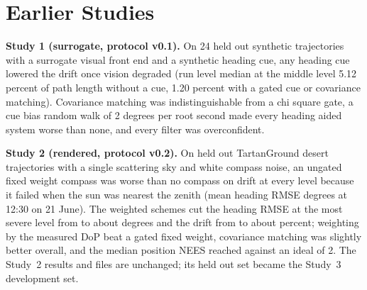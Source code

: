\section{Earlier Studies}
\label{sec:earlier}
\textbf{Study 1 (surrogate, protocol v0.1).} On 24 held out synthetic trajectories with a surrogate visual front end and a synthetic heading cue, any heading cue lowered the drift once vision degraded (run level median at the middle level 5.12 percent of path length without a cue, 1.20 percent with a gated cue or covariance matching). Covariance matching was indistinguishable from a chi square gate, a cue bias random walk of 2 degrees per root second made every heading aided system worse than none, and every filter was overconfident.

\textbf{Study 2 (rendered, protocol v0.2).} On \nnTraj{} held out TartanGround desert trajectories with a single scattering sky and white compass noise, an ungated fixed weight compass was worse than no compass on drift at every level because it failed when the sun was nearest the zenith (mean heading RMSE \nhnoonBone{} degrees at 12:30 on 21 June). The weighted schemes cut the heading RMSE at the most severe level from \nthdBzerofour{} to about \nthdBthreefour{} degrees and the drift from \ntdrBzerofour{} to about \ntdrBthreefour{} percent; weighting by the measured DoP beat a gated fixed weight, covariance matching was slightly better overall, and the median position NEES reached \nneBonethree{} against an ideal of 2. The Study~2 results and files are unchanged; its held out set became the Study~3 development set.
